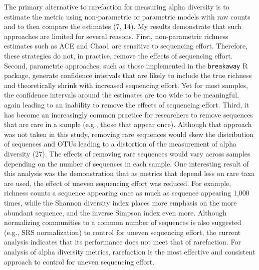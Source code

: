 \documentclass[
]{article}
\begin{document}
The primary alternative to rarefaction for measuring alpha diversity is
to estimate the metric using non-parametric or parametric models with
raw counts and to then compare the estimates (7, 14). My results
demonstrate that such approaches are limited for several reasons. First,
non-parametric richness estimates such as ACE and Chao1 are sensitive to
sequencing effort. Therefore, these strategies do not, in practice,
remove the effects of sequencing effort. Second, parametric approaches,
such as those implemented in the \texttt{breakaway} R package, generate
confidence intervals that are likely to include the true richness and
theoretically shrink with increased sequencing effort. Yet for most
samples, the confidence intervals around the estimates are too wide to
be meaningful, again leading to an inability to remove the effects of
sequencing effort. Third, it has become an increasingly common practice
for researchers to remove sequences that are rare in a sample (e.g.,
those that appear once). Although that approach was not taken in this
study, removing rare sequences would skew the distribution of sequences
and OTUs leading to a distortion of the measurement of alpha diversity
(27). The effects of removing rare sequences would vary across samples
depending on the number of sequences in each sample. One interesting
result of this analysis was the demonstration that as metrics that
depend less on rare taxa are used, the effect of uneven sequencing
effort was reduced. For example, richness counts a sequence appearing
once as much as sequence appearing 1,000 times, while the Shannon
diversity index places more emphasis on the more abundant sequence, and
the inverse Simpson index even more. Although normalizing communities to
a common number of sequences is also suggested (e.g., SRS normalization)
to control for uneven sequencing effort, the current analysis indicates
that its performance does not meet that of rarefaction. For analysis of
alpha diversity metrics, rarefaction is the most effective and
consistent approach to control for uneven sequencing effort.
\end{document}

